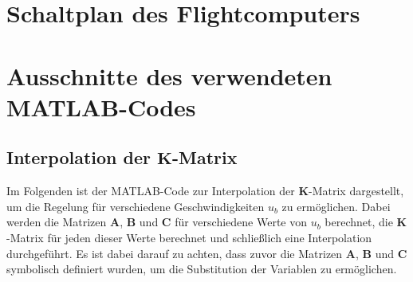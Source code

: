 \chapter{Schaltplan des Flightcomputers}
\label{ch:komadori_schaltplan}



\chapter{Ausschnitte des verwendeten MATLAB-Codes}
\label{ch:matlab_code}
\section{Interpolation der $\mathbf{K}$-Matrix}
Im Folgenden ist der MATLAB-Code zur Interpolation der $\mathbf{K}$-Matrix dargestellt, um die Regelung für verschiedene Geschwindigkeiten $u_b$ zu ermöglichen. Dabei werden die Matrizen $\mathbf{A}$, $\mathbf{B}$ und $\mathbf{C}$ für verschiedene Werte von $u_b$ berechnet, die $\mathbf{K}$-Matrix für jeden dieser Werte berechnet und schließlich eine Interpolation durchgeführt. Es ist dabei darauf zu achten, dass zuvor die Matrizen $\mathbf{A}$, $\mathbf{B}$ und $\mathbf{C}$ symbolisch definiert wurden, um die Substitution der Variablen zu ermöglichen.
